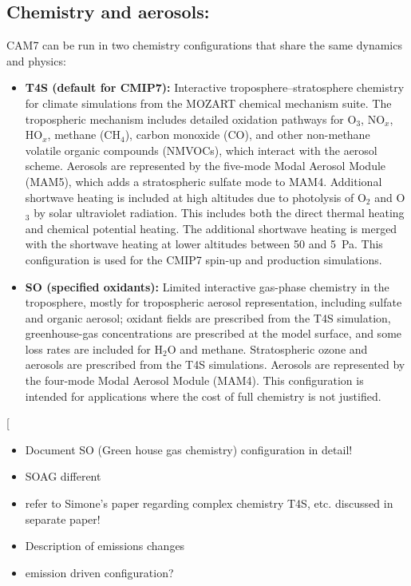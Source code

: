 \documentclass[draft]{agujournal2019}
\begin{document}
 \subsection{Chemistry and aerosols:} CAM7 can be run in two chemistry configurations that share the same dynamics and physics:
\begin{itemize}
  \item \textbf{T4S (default for CMIP7):} Interactive troposphere--stratosphere chemistry for climate simulations from the MOZART chemical mechanism suite. The tropospheric mechanism includes detailed oxidation pathways for O$_3$, NO$_x$, HO$_x$, methane (CH$_4$), carbon monoxide (CO), and other non-methane volatile organic compounds (NMVOCs), which interact with the aerosol scheme. Aerosols are represented by the five-mode Modal Aerosol Module (MAM5), which adds a stratospheric sulfate mode to MAM4. Additional shortwave heating is included at high altitudes due to photolysis of O$_2$ and O$_3$ by solar ultraviolet radiation. This includes both the direct thermal heating and chemical potential heating. The additional shortwave heating is merged with the shortwave heating at lower altitudes between 50 and 5~Pa. This configuration is used for the CMIP7 spin-up and production simulations.
  \item \textbf{SO (specified oxidants):} Limited interactive gas-phase chemistry in the troposphere, mostly for tropospheric aerosol representation, including sulfate and organic aerosol; oxidant fields are prescribed from the T4S simulation, greenhouse-gas concentrations are prescribed at the model surface, and some loss rates are included for H$_2$O and methane. Stratospheric ozone and aerosols are prescribed from the T4S simulations. Aerosols are represented by the four-mode Modal Aerosol Module (MAM4). This configuration is intended for applications where the cost of full chemistry is not justified.
\end{itemize}
 [
 \begin{itemize}
     \item Document SO (Green house gas chemistry) configuration in detail!
     \item SOAG different
     \item refer to Simone's paper regarding complex chemistry T4S, etc. discussed in separate paper!
     \item Description of emissions changes
    \item emission driven configuration?
 \end{itemize}
 
\end{document}
